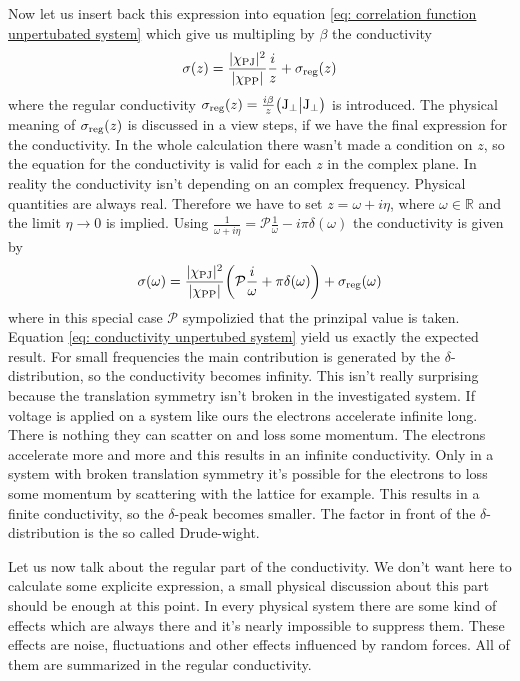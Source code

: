 %
Now let us insert back this expression into equation \eqref{eq: correlation function unpertubated system} which give us multipling by $\beta$ the conductivity
%
\begin{align}
	\sigma (z) = \frac{\vert\chi_{\mathrm{PJ}}\vert^{2}}{\vert\chi_{\mathrm{PP}}\vert} \frac{i}{z}  + \sigma_{\mathrm{reg}}(z)
\end{align}
%
where the regular conductivity $\sigma_{\mathrm{reg}}(z) = \frac{i \beta}{z} \big({\mathrm{J}_{\bot}}\big|{\mathrm{J}_{\bot}}\big)$ is introduced.
The physical meaning of $\sigma_{\mathrm{reg}}(z)$ is discussed in a view steps, if we have the final expression for the conductivity.
In the whole calculation there wasn't made a condition on $z$, so the equation for the conductivity is valid for each $z$ in the complex plane.
In reality the conductivity isn't depending on an complex frequency.
Physical quantities are always real.
Therefore we have to set $z = \omega + i \eta$, where $\omega \in \mathbb{R}$ and the limit $\eta \to 0$ is implied.
Using $\frac{1}{\omega + i\eta} = \mathcal{P}\frac{1}{\omega} - i\pi\delta(\omega)$ the conductivity is given by
%
\begin{align}
	\sigma(\omega) = \frac{\vert\chi_{\mathrm{PJ}}\vert^{2}}{\vert\chi_{\mathrm{PP}}\vert} \bigg( \mathcal{P} \frac{i}{\omega} + \pi \delta(\omega) \bigg) + \sigma_{\mathrm{reg}}(\omega)
	\label{eq: conductivity unpertubed system}
\end{align}
%
where in this special case $\mathcal{P}$ sympolizied that the prinzipal value is taken.
Equation \eqref{eq: conductivity unpertubed system} yield us exactly the expected result.
For small frequencies the main contribution is generated by the $\delta$-distribution, so the conductivity becomes infinity.
This isn't really surprising because the translation symmetry isn't broken in the investigated system.
If voltage is applied on a system like ours the electrons accelerate infinite long.
There is nothing they can scatter on and loss some momentum.
The electrons accelerate more and more and this results in an infinite conductivity.
Only in a system with broken translation symmetry it's possible for the electrons to loss some momentum by scattering with the lattice for example.
This results in a finite conductivity, so the $\delta$-peak becomes smaller.
The factor in front of the $\delta$-distribution is the so called Drude-wight.

Let us now talk about the regular part of the conductivity.
We don't want here to calculate some explicite expression, a small physical discussion about this part should be enough at this point.
In every physical system there are some kind of effects which are always there and it's nearly impossible to suppress them.
These effects are noise, fluctuations and other effects influenced by random forces.
All of them are summarized in the regular conductivity.
%
%
